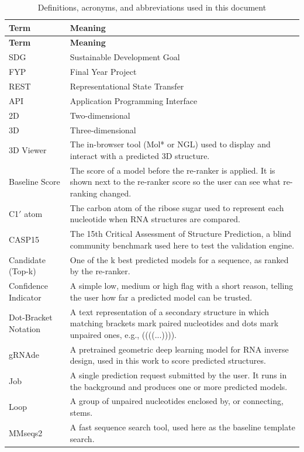 \documentclass{FastFyp}
\begin{document}
\begin{longtable}{p{} p{}}
\caption{Definitions, acronyms, and abbreviations used in this document}\label{tab:defs}\\
\hline
\textbf{Term} & \textbf{Meaning}\\
\hline
\endfirsthead
\hline
\textbf{Term} & \textbf{Meaning}\\
\hline
\endhead
SDG & Sustainable Development Goal\\
FYP & Final Year Project\\
REST & Representational State Transfer\\
API & Application Programming Interface\\
2D & Two-dimensional\\
3D & Three-dimensional\\
3D Viewer & The in-browser tool (Mol* or NGL) used to display and interact with a predicted 3D structure.\\
Baseline Score & The score of a model before the re-ranker is applied. It is shown next to the re-ranker score so the user can see what re-ranking changed.\\
C1$'$ atom & The carbon atom of the ribose sugar used to represent each nucleotide when RNA structures are compared.\\
CASP15 & The 15th Critical Assessment of Structure Prediction, a blind community benchmark used here to test the validation engine.\\
Candidate (Top-k) & One of the k best predicted models for a sequence, as ranked by the re-ranker.\\
Confidence Indicator & A simple low, medium or high flag with a short reason, telling the user how far a predicted model can be trusted.\\
Dot-Bracket Notation & A text representation of a secondary structure in which matching brackets mark paired nucleotides and dots mark unpaired ones, e.g., ((((...)))).\\
gRNAde & A pretrained geometric deep learning model for RNA inverse design, used in this work to score predicted structures.\\
Job & A single prediction request submitted by the user. It runs in the background and produces one or more predicted models.\\
Loop & A group of unpaired nucleotides enclosed by, or connecting, stems.\\
MMseqs2 & A fast sequence search tool, used here as the baseline template search.\\

\end{longtable}
\end{document}
